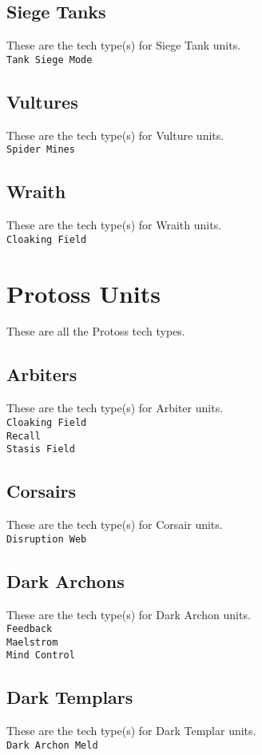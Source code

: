 \subsection{Siege Tanks}
These are the tech type(s) for Siege Tank units. \\
\verb|Tank Siege Mode| 

\subsection{Vultures}
These are the tech type(s) for Vulture units. \\
\verb|Spider Mines|

\subsection{Wraith}
These are the tech type(s) for Wraith units. \\
\verb|Cloaking Field| 

\section{Protoss Units}
These are all the Protoss tech types.

\subsection{Arbiters}
These are the tech type(s) for Arbiter units. \\
\verb|Cloaking Field| \\
\verb|Recall| \\
\verb|Stasis Field|

\subsection{Corsairs}
These are the tech type(s) for Corsair units. \\
\verb|Disruption Web|

\subsection{Dark Archons}
These are the tech type(s) for Dark Archon units. \\
\verb|Feedback| \\
\verb|Maelstrom| \\
\verb|Mind Control|

\subsection{Dark Templars}
These are the tech type(s) for Dark Templar units. \\
\verb|Dark Archon Meld|

